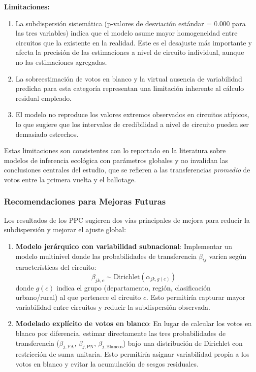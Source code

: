 \textbf{Limitaciones:}
\begin{enumerate}
    \item La subdispersi\'on sistem\'atica (p-valores de desviaci\'on est\'andar = 0.000 para las tres variables) indica que el modelo asume mayor homogeneidad entre circuitos que la existente en la realidad. Este es el desajuste m\'as importante y afecta la precisi\'on de las estimaciones a nivel de circuito individual, aunque no las estimaciones agregadas.

    \item La sobreestimaci\'on de votos en blanco y la virtual ausencia de variabilidad predicha para esta categor\'ia representan una limitaci\'on inherente al c\'alculo residual empleado.

    \item El modelo no reproduce los valores extremos observados en circuitos at\'ipicos, lo que sugiere que los intervalos de credibilidad a nivel de circuito pueden ser demasiado estrechos.
\end{enumerate}

Estas limitaciones son consistentes con lo reportado en la literatura sobre modelos de inferencia ecol\'ogica con par\'ametros globales \citep{king1997} y no invalidan las conclusiones centrales del estudio, que se refieren a las transferencias \emph{promedio} de votos entre la primera vuelta y el ballotage.

\subsubsection{Recomendaciones para Mejoras Futuras}

Los resultados de los PPC sugieren dos v\'ias principales de mejora para reducir la subdispersi\'on y mejorar el ajuste global:

\begin{enumerate}
    \item \textbf{Modelo jer\'arquico con variabilidad subnacional}: Implementar un modelo multinivel donde las probabilidades de transferencia $\beta_{ij}$ var\'ien seg\'un caracter\'isticas del circuito:
    \begin{equation}
    \beta_{jk,c} \sim \text{Dirichlet}(\alpha_{jk,g(c)})
    \end{equation}
    donde $g(c)$ indica el grupo (departamento, regi\'on, clasificaci\'on urbano/rural) al que pertenece el circuito $c$. Esto permitir\'ia capturar mayor variabilidad entre circuitos y reducir la subdispersi\'on observada.

    \item \textbf{Modelado expl\'icito de votos en blanco}: En lugar de calcular los votos en blanco por diferencia, estimar directamente las tres probabilidades de transferencia ($\beta_{j,\text{FA}}$, $\beta_{j,\text{PN}}$, $\beta_{j,\text{Blancos}}$) bajo una distribuci\'on de Dirichlet con restricci\'on de suma unitaria. Esto permitir\'ia asignar variabilidad propia a los votos en blanco y evitar la acumulaci\'on de sesgos residuales.
\end{enumerate}

